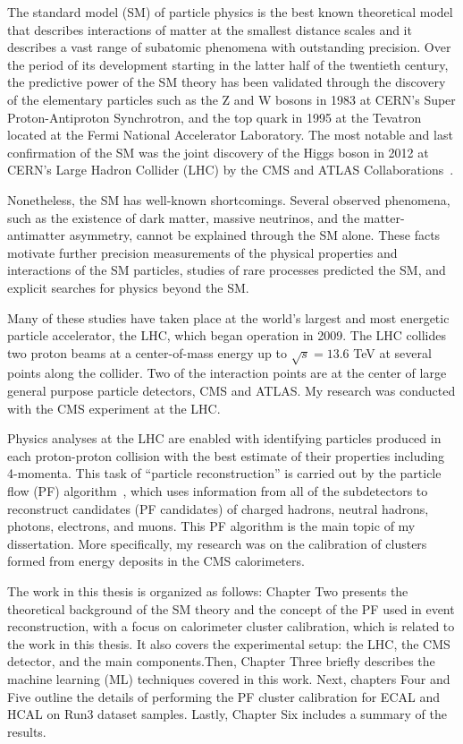
The standard model (SM) of particle physics %
is the best known theoretical model that describes interactions of matter at the smallest %
distance scales and it describes a vast range of subatomic phenomena with outstanding precision. Over the period of its development starting in the latter half of the twentieth century, the predictive power of the SM theory has been validated through the discovery of the elementary particles such as the Z and W bosons in 1983 at CERN's Super Proton-Antiproton Synchrotron, and the top quark in 1995 at the Tevatron located at the Fermi National Accelerator Laboratory. The most notable and last confirmation of the SM was the joint discovery of the Higgs boson in 2012 at CERN's Large Hadron Collider (LHC) by the CMS and ATLAS Collaborations~\cite{ATLAS:2012yve,CMS:2012qbp,CMS:2013btf}.

Nonetheless, the SM has well-known shortcomings. Several observed phenomena, such as the existence of dark matter, massive neutrinos, and the matter-antimatter asymmetry, cannot be explained through the SM alone.
These facts motivate further precision measurements of the physical properties and interactions of the SM particles, studies of rare processes predicted the SM, and explicit searches for physics beyond the SM.

Many of these studies have taken place at the world's largest and most energetic particle accelerator, the LHC, which began operation in 2009. The LHC collides two proton beams at a center-of-mass energy up to $\sqrt{s}=13.6$ TeV at several points along the collider. Two of the interaction points are at the center of large general purpose particle detectors, CMS and ATLAS. My research was conducted with the CMS experiment at the LHC.

Physics analyses at the LHC are enabled with identifying particles produced in each proton-proton collision with the best estimate of their properties including 4-momenta.
This task of ``particle reconstruction'' is carried out by the particle flow (PF) algorithm~\cite{PF}, which uses information from all of the subdetectors
to reconstruct candidates (PF candidates) of charged hadrons, neutral hadrons, photons, electrons, and muons.
This PF algorithm is the main topic of my dissertation.
More specifically, my research was on the calibration of clusters formed from energy deposits in the CMS calorimeters.

The work in this thesis is organized as follows:
Chapter Two presents the theoretical background of the SM theory and the concept of the PF used in event reconstruction, with a focus on calorimeter cluster calibration, which is related to the work in this thesis.
It also covers the experimental setup: the LHC, the CMS detector, and the main components.Then, Chapter Three briefly describes	the machine learning (ML) techniques covered in	this work.
Next, chapters Four and Five outline the details of performing the PF cluster calibration for ECAL and HCAL on Run3 dataset samples.
Lastly, Chapter Six includes a summary of the results.
